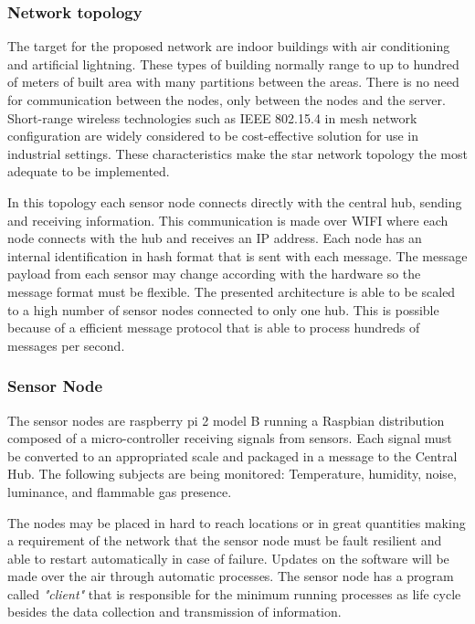 \documentclass[letterpaper]{IEEEtran}
\begin{document}
\subsubsection{Network topology}
The target for the proposed network are indoor buildings with air conditioning and artificial lightning.
These types of building normally range to up to hundred of meters of built area with many partitions between the areas.
There is no need for communication between the nodes, only between the nodes and the server.
Short-range wireless technologies such as IEEE 802.15.4 in mesh network configuration are widely considered to be cost-effective solution for use in industrial settings\cite{Cheffena2012}.
These characteristics make the star network topology the most adequate to be implemented.

In this topology each sensor node connects directly with the central hub, sending and receiving information.
This communication is made over WIFI where each node connects with the hub and receives an IP address.
Each node has an internal identification in hash format that is sent with each message.
\IEEEpubidadjcol
The message payload from each sensor may change according with the hardware so the message format must be flexible.
The presented architecture is able to be scaled to a high number of sensor nodes connected to only one hub. This is possible because of a efficient message protocol that is able to process hundreds of messages per second\cite{Scalagent2015}.

\subsubsection{Sensor Node}
The sensor nodes are raspberry pi 2 model B \cite{Raspberry2015} running a Raspbian\cite{Raspbian2015} distribution composed of a micro-controller receiving signals from sensors.
Each signal must be converted to an appropriated scale and packaged in a message to the Central Hub.
The following subjects are being monitored: Temperature, humidity, noise, luminance, and flammable gas presence.

The nodes may be placed in hard to reach locations or in great quantities making a requirement of the network that the sensor node must be fault resilient and able to restart automatically in case of failure.
Updates on the software will be made over the air through automatic processes.
The sensor node has a program called \textit{"client"} that is responsible for the minimum running processes as life cycle besides the data collection and transmission of information.
\end{document}
